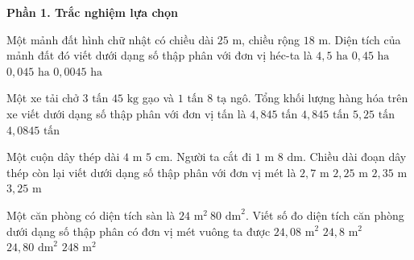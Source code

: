 \textbf{Phần 1. Trắc nghiệm lựa chọn}

\begin{ex} %
Một mảnh đất hình chữ nhật có chiều dài $25\text{ m}$, chiều rộng $18\text{ m}$. Diện tích của mảnh đất đó viết dưới dạng số thập phân với đơn vị héc-ta là
\choice
{$4{,}5\text{ ha}$}
{$0{,}45\text{ ha}$}
{\True $0{,}045\text{ ha}$}
{$0{,}0045\text{ ha}$}
\end{ex}

\begin{ex} %
Một xe tải chở $3\text{ tấn } 45\text{ kg}$ gạo và $1\text{ tấn } 8\text{ tạ}$ ngô. Tổng khối lượng hàng hóa trên xe viết dưới dạng số thập phân với đơn vị tấn là
\choice
{$4{,}845\text{ tấn}$}
{\True $4{,}845\text{ tấn}$}
{$5{,}25\text{ tấn}$}
{$4{,}0845\text{ tấn}$}
\end{ex}

\begin{ex} %
Một cuộn dây thép dài $4\text{ m } 5\text{ cm}$. Người ta cắt đi $1\text{ m } 8\text{ dm}$. Chiều dài đoạn dây thép còn lại viết dưới dạng số thập phân với đơn vị mét là
\choice
{$2{,}7\text{ m}$}
{\True $2{,}25\text{ m}$}
{$2{,}35\text{ m}$}
{$3{,}25\text{ m}$}
\end{ex}

\begin{ex} %
Một căn phòng có diện tích sàn là $24\text{ m}^2\ 80\text{ dm}^2$. Viết số đo diện tích căn phòng dưới dạng số thập phân có đơn vị mét vuông ta được
\choice
{$24{,}08\text{ m}^2$}
{\True $24{,}8\text{ m}^2$}
{$24{,}80\text{ dm}^2$}
{$248\text{ m}^2$}
\end{ex}

